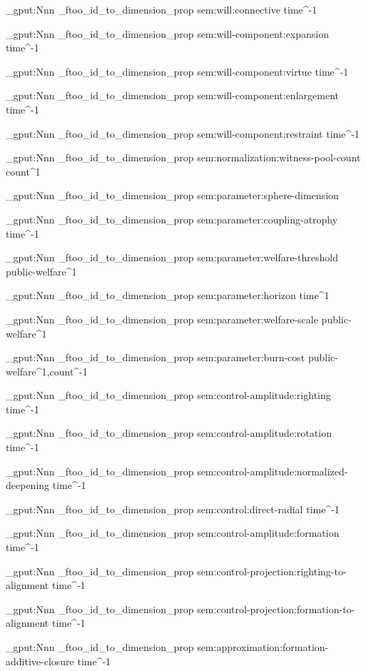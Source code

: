 \prop_gput:Nnn \g_ftoo_id_to_dimension_prop { sem:will:connective } { time^-1 }

\prop_gput:Nnn \g_ftoo_id_to_dimension_prop { sem:will-component:expansion } { time^-1 }

\prop_gput:Nnn \g_ftoo_id_to_dimension_prop { sem:will-component:virtue } { time^-1 }

\prop_gput:Nnn \g_ftoo_id_to_dimension_prop { sem:will-component:enlargement } { time^-1 }

\prop_gput:Nnn \g_ftoo_id_to_dimension_prop { sem:will-component:restraint } { time^-1 }

\prop_gput:Nnn \g_ftoo_id_to_dimension_prop { sem:normalization:witness-pool-count } { count^1 }

\prop_gput:Nnn \g_ftoo_id_to_dimension_prop { sem:parameter:sphere-dimension } {  }

\prop_gput:Nnn \g_ftoo_id_to_dimension_prop { sem:parameter:coupling-atrophy } { time^-1 }

\prop_gput:Nnn \g_ftoo_id_to_dimension_prop { sem:parameter:welfare-threshold } { public-welfare^1 }

\prop_gput:Nnn \g_ftoo_id_to_dimension_prop { sem:parameter:horizon } { time^1 }

\prop_gput:Nnn \g_ftoo_id_to_dimension_prop { sem:parameter:welfare-scale } { public-welfare^1 }

\prop_gput:Nnn \g_ftoo_id_to_dimension_prop { sem:parameter:burn-cost } { public-welfare^1,count^-1 }

\prop_gput:Nnn \g_ftoo_id_to_dimension_prop { sem:control-amplitude:righting } { time^-1 }

\prop_gput:Nnn \g_ftoo_id_to_dimension_prop { sem:control-amplitude:rotation } { time^-1 }

\prop_gput:Nnn \g_ftoo_id_to_dimension_prop { sem:control-amplitude:normalized-deepening } { time^-1 }

\prop_gput:Nnn \g_ftoo_id_to_dimension_prop { sem:control:direct-radial } { time^-1 }

\prop_gput:Nnn \g_ftoo_id_to_dimension_prop { sem:control-amplitude:formation } { time^-1 }

\prop_gput:Nnn \g_ftoo_id_to_dimension_prop { sem:control-projection:righting-to-alignment } { time^-1 }

\prop_gput:Nnn \g_ftoo_id_to_dimension_prop { sem:control-projection:formation-to-alignment } { time^-1 }

\prop_gput:Nnn \g_ftoo_id_to_dimension_prop { sem:approximation:formation-additive-closure } { time^-1 }

